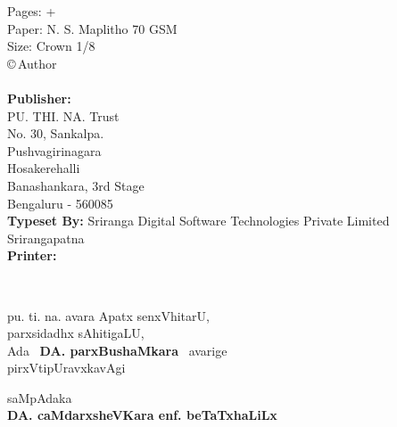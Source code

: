\noindent
{\eng\fontsize{10}{12}\selectfont 
Pages: \pageref{prelims:end} + \pageref{book:end}\\[3pt]
Paper: N. S. Maplitho 70 GSM\\
Size: Crown 1/8\\[3pt]
\copyright\,Author\\[30pt]
\rupee \\[30pt]
{\eng\bfseries Publisher:}\\ 
PU. THI. NA. Trust\\
No. 30, Sankalpa.\\
Pushvagirinagara\\
Hosakerehalli\\
Banashankara, 3rd Stage\\
Bengaluru - 560085\\[15pt]
{\eng\bfseries Typeset By:} Sriranga Digital Software Technologies Private Limited\\
Srirangapatna\\[15pt]
{\eng\bfseries Printer:}}

\newpage

\thispagestyle{empty}
~\phantom{a}

\vfill

\begin{minipage}[c]{8cm}
\begin{center}
pu. ti. na. avara Apatx senxVhitarU,\\[3pt]
parxsidadhx sAhitigaLU,\\[3pt]
Ada~ {\large\bf DA. parxBushaMkara}~ avarige\\[3pt]
pirxVtipUravxkavAgi
\end{center}

\bigskip

\begin{flushright}
saMpAdaka\hspace{1.2cm}\,\\[3pt]
{\bf DA. caMdarxsheVKara enf. beTaTxhaLiLx}
\end{flushright}
\end{minipage}

\vfill\eject

\thispagestyle{empty}
~\phantom{a}

